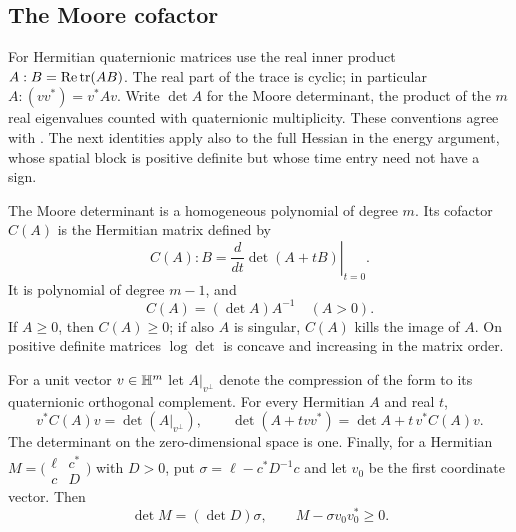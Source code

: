 \subsection{The Moore cofactor}

For Hermitian quaternionic matrices use the real inner product
$A:B=\operatorname{Re}\operatorname{tr}(AB)$. The real part of the trace is cyclic; in particular
$A:(vv^*)=v^*Av$. Write $\det A$ for the Moore determinant, the product
of the $m$ real eigenvalues counted with quaternionic multiplicity.
These conventions agree with \cite[Section~1.1, especially Theorems
1.1.8--1.1.9]{Alesker2003LA}. The next identities apply also to the
full Hessian in the energy argument, whose spatial block is positive
definite but whose time entry need not have a sign.

\begin{lemma}\label{lem:quaternionic-matrices}
The Moore determinant is a homogeneous polynomial of degree $m$.
Its cofactor $C(A)$ is the Hermitian matrix defined by
\begin{equation}\label{eq:cofactor-definition}
 C(A):B=\left.\frac{d}{dt}\det(A+tB)\right|_{t=0}.
\end{equation}
It is polynomial of degree $m-1$, and
\begin{equation}\label{eq:cofactor-inverse}
 C(A)=(\det A) A^{-1}\quad (A>0).
\end{equation}
If $A\ge0$, then $C(A)\ge0$; if also $A$ is singular, $C(A)$ kills
the image of $A$. On positive definite matrices $\log\det$ is concave
and increasing in the matrix order.

For a unit vector $v\in\mathbb H^m$ let $A|_{v^\perp}$ denote the
compression of the form to its quaternionic orthogonal complement.
For every Hermitian $A$ and real $t$,
\begin{equation}\label{eq:cofactor-restriction}
  v^*C(A)v=\det(A|_{v^\perp}),\qquad
  \det(A+t vv^*)=\det A+t\,v^*C(A)v.
\end{equation}
The determinant on the zero-dimensional space is one. Finally, for a
Hermitian $M=\bigl(\begin{smallmatrix}\ell&c^*\\ c&D\end{smallmatrix}\bigr)$
with $D>0$, put $\sigma=\ell-c^*D^{-1}c$ and let $v_0$ be the first
coordinate vector. Then
\begin{equation}\label{eq:schur-complement}
     \det M=(\det D)\sigma,\qquad M-\sigma v_0v_0^*\ge0 .
\end{equation}
\end{lemma}

